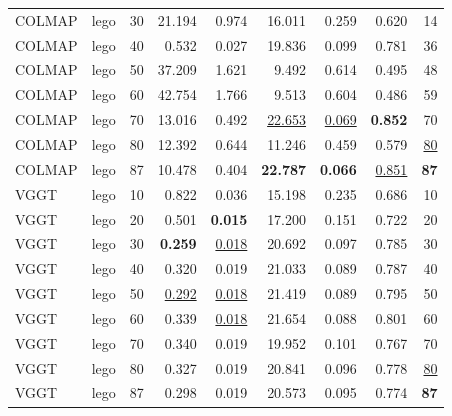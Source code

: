 \begin{table}[H]
\begin{tabular}{llrrrrrrr}
COLMAP & lego & 30 & 21.194 & 0.974 & 16.011 & 0.259 & 0.620 & 14 \\
COLMAP & lego & 40 & 0.532 & 0.027 & 19.836 & 0.099 & 0.781 & 36 \\
COLMAP & lego & 50 & 37.209 & 1.621 & 9.492 & 0.614 & 0.495 & 48 \\
COLMAP & lego & 60 & 42.754 & 1.766 & 9.513 & 0.604 & 0.486 & 59 \\
COLMAP & lego & 70 & 13.016 & 0.492 & \underline{22.653} & \underline{0.069} & \textbf{0.852} & 70 \\
COLMAP & lego & 80 & 12.392 & 0.644 & 11.246 & 0.459 & 0.579 & \underline{80} \\
COLMAP & lego & 87 & 10.478 & 0.404 & \textbf{22.787} & \textbf{0.066} & \underline{0.851} & \textbf{87} \\
VGGT & lego & 10 & 0.822 & 0.036 & 15.198 & 0.235 & 0.686 & 10 \\
VGGT & lego & 20 & 0.501 & \textbf{0.015} & 17.200 & 0.151 & 0.722 & 20 \\
VGGT & lego & 30 & \textbf{0.259} & \underline{0.018} & 20.692 & 0.097 & 0.785 & 30 \\
VGGT & lego & 40 & 0.320 & 0.019 & 21.033 & 0.089 & 0.787 & 40 \\
VGGT & lego & 50 & \underline{0.292} & \underline{0.018} & 21.419 & 0.089 & 0.795 & 50 \\
VGGT & lego & 60 & 0.339 & \underline{0.018} & 21.654 & 0.088 & 0.801 & 60 \\
VGGT & lego & 70 & 0.340 & 0.019 & 19.952 & 0.101 & 0.767 & 70 \\
VGGT & lego & 80 & 0.327 & 0.019 & 20.841 & 0.096 & 0.778 & \underline{80} \\
VGGT & lego & 87 & 0.298 & 0.019 & 20.573 & 0.095 & 0.774 & \textbf{87} \\
\bottomrule
\end{tabular}
\end{table}